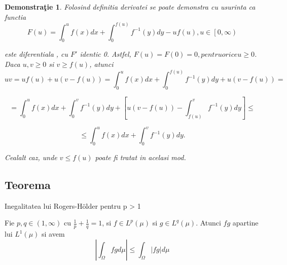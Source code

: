 \documentclass[a4paper,12pt,oneside]{report}
\newtheorem{demonstration}{Demonstra\c tie}
\begin{document}
\begin{demonstration}
Folosind definitia derivatei se poate demonstra cu usurinta ca functia 
\begin{displaymath}
  F\left ( u \right )= \int_{0}^{u}f\left ( x \right )dx + \int_{0}^{f\left ( u \right )}f^{-1}\left ( y \right )dy -uf\left ( u \right ), u \in \left [ 0,\infty  \right )
\end{displaymath}

este diferentiala , cu \({F}'\) identic 0. Astfel, \(F\left ( u \right )= F\left ( 0 \right )= 0, pentru orice u\geq 0\). 
	Daca \(u, v \geq 0\)  si \(v\geq f\left ( u \right )\), atunci 
\begin{displaymath}
  uv = uf\left ( u \right )+ u\left ( v- f\left ( u \right ) \right )=  \int_{0}^{u}f\left ( x \right )dx + \int_{0}^{f\left ( u \right )}f^{-1}\left ( y \right )dy + u\left ( v - f\left ( u \right ) \right ) =
\end{displaymath}

\begin{displaymath}
  = \int_{0}^{u}f\left ( x \right )dx + \int_{0}^{v}f^{-1}\left ( y \right )dy + \left [ u\left ( v-f\left ( u \right )  \right ) - \int_{f\left ( u \right )}^{v}f^{-1}\left ( y \right )dy\right ]\leq 
\end{displaymath}

\begin{displaymath}
  \leq \int_{0}^{u}f\left ( x \right )dx + \int_{0}^{v}f^{-1}\left ( y \right )dy.
\end{displaymath}



	Cealalt caz, unde \(v\leq f\left ( u \right )\) poate fi tratat in acelasi mod. 
\end{demonstration}

\subsection{Teorema}

Inegalitatea lui Rogers-Hölder pentru p > 1

Fie \(p,q \in \left ( 1, \infty  \right )\) cu \(\frac{1}{p} + \frac{1}{q} = 1\), si  \(f\in L^{p}\left ( \mu  \right )\) si \(g\in L^{q}\left ( \mu  \right )\). Atunci \(fg\) apartine lui \(L^{1}\left ( \mu  \right )\) si avem 
\begin{displaymath}
  \left | \int_{\Omega}^{} fg  d\mu \right |\leq \int_{\Omega}^{}\left | fg \right |d\mu \label{eq:1.6} \tag{1.6}
\end{displaymath}
\end{document}

